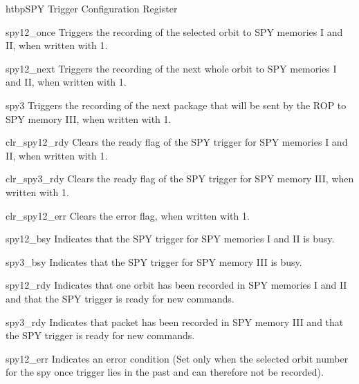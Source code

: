 \begin{register}{htbp}{SPY Trigger Configuration Register}{}%
	\label{spy_trig_cfg_reg}%
	\regnewline%

	\begin{regdesc}
	\begin{reglist}
		\item [spy12\_once] Triggers the recording of the selected orbit to SPY memories I and II, when written with 1.
		\item [spy12\_next] Triggers the recording of the next whole orbit to SPY memories I and II, when written with 1.
		\item [spy3] Triggers the recording of the next package that will be sent by the ROP to SPY memory III, when written with 1.
		\item [clr\_spy12\_rdy] Clears the ready flag of the SPY trigger for SPY memories I and II, when written with 1.
		\item [clr\_spy3\_rdy] Clears the ready flag of the SPY trigger for SPY memory III, when written with 1.
		\item [clr\_spy12\_err] Clears the error flag, when written with 1.
		\item [spy12\_bsy] Indicates that the SPY trigger for SPY memories I and II is busy.
		\item [spy3\_bsy] Indicates that the SPY trigger for SPY memory III is busy.
		\item [spy12\_rdy] Indicates that one orbit has been recorded in SPY memories I and II and that the SPY trigger is ready for new commands.
		\item [spy3\_rdy] Indicates that packet has been recorded in SPY memory III and that the SPY trigger is ready for new commands.
		\item [spy12\_err] Indicates an error condition (Set only when the selected orbit number for the spy once trigger lies in the past and can therefore not be recorded).
	\end{reglist}
	\end{regdesc}
\end{register}

